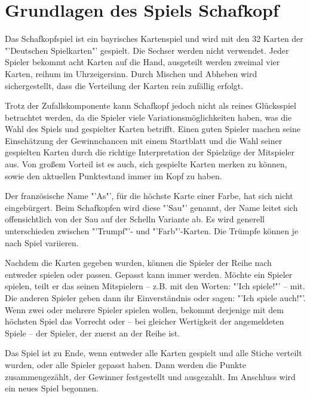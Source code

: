 \documentclass[
							a4paper, 
							11pt, 
							openany, 
							liststotoc,
							parskip=half, 
   							headings=normal
						]{scrreprt}
\begin{document}
{%
\section{Grundlagen des Spiels Schafkopf} \label{se:grundlagen_schafkopf}
Das Schafkopfspiel ist ein bayrisches Kartenspiel und wird mit den 32 Karten der "'Deutschen Spielkarten"' gespielt. Die Sechser werden nicht verwendet. Jeder Spieler bekommt acht Karten auf die Hand, ausgeteilt werden zweimal vier Karten, reihum im Uhrzeigersinn. Durch Mischen und Abheben wird sichergestellt, dass die Verteilung der Karten rein zufällig erfolgt.

Trotz der Zufallskomponente kann Schafkopf jedoch nicht als reines Glücksspiel betrachtet werden, da die Spieler viele Variationsmöglichkeiten haben, was die Wahl des Spiels und gespielter Karten betrifft. Einen guten Spieler machen seine Einschätzung der Gewinnchancen mit einem Startblatt und die Wahl seiner gespielten Karten durch die richtige Interpretation der Spielzüge der Mitspieler aus. Von großem Vorteil ist es auch, sich gespielte Karten merken zu können, sowie den aktuellen Punktestand immer im Kopf zu haben.

Der französische Name "'As"', für die höchste Karte einer Farbe, hat sich nicht eingebürgert. Beim Schafkopfen wird diese "'Sau"' genannt, der Name leitet sich offensichtlich von der Sau auf der Schelln Variante ab. Es wird generell unterschieden zwischen "'Trumpf"'- und "'Farb"'-Karten. Die Trümpfe können je nach Spiel variieren.

Nachdem die Karten gegeben wurden, können die Spieler der Reihe nach entweder spielen oder passen. Gepasst kann immer werden. Möchte ein Spieler spielen, teilt er das seinen Mitspielern -- z.B. mit den Worten: "'Ich spiele!"' -- mit. Die anderen Spieler geben dann ihr Einverständnis oder sagen: "'Ich spiele auch!"'. Wenn zwei oder mehrere Spieler spielen wollen, bekommt derjenige mit dem höchsten Spiel das Vorrecht oder -- bei gleicher Wertigkeit der angemeldeten Spiele -- der Spieler, der zuerst an der Reihe ist.

Das Spiel ist zu Ende, wenn entweder alle Karten gespielt und alle Stiche verteilt wurden, oder alle Spieler gepasst haben.
Dann werden die Punkte zusammengezählt, der Gewinner festgestellt und ausgezahlt. Im Anschluss wird ein neues Spiel begonnen.

\cite[Kapitel 2]{merschbacher:schafkopf}

\clearpage

}
\end{document}
